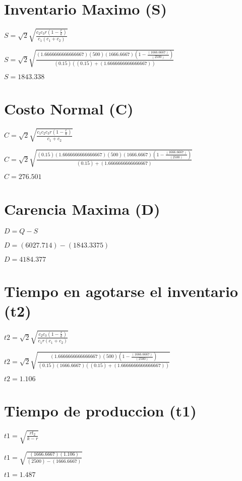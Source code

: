 \documentclass{article}
\newcommand*\rbreak{\par\noindent\linebreak}
\begin{document}
\section{\Huge \Huge Inventario Maximo (S)}
\begin{huge}
$S = \sqrt{2} \sqrt{\frac{c_{2} c_{3} r \left(1 - \frac{r}{k}\right)}{c_{1} \left(c_{1} + c_{2}\right)}}$\rbreak
$S = \sqrt{2} \sqrt{\frac{(1.6666666666666667) (500)  (1666.6667)  \left(1 - \frac{ (1666.6667) }{ (2500) }\right)}{(0.15) \left((0.15) + (1.6666666666666667)\right)}}$\rbreak
$S = 1843.338$
\end{huge}
\section{\Huge \Huge Costo Normal (C)}
\begin{huge}
$C = \sqrt{2} \sqrt{\frac{c_{1} c_{2} c_{3} r \left(1 - \frac{r}{k}\right)}{c_{1} + c_{2}}}$\rbreak
$C = \sqrt{2} \sqrt{\frac{(0.15) (1.6666666666666667) (500)  (1666.6667)  \left(1 - \frac{ (1666.6667) }{ (2500) }\right)}{(0.15) + (1.6666666666666667)}}$\rbreak
$C = 276.501$
\end{huge}
\section{\Huge \Huge Carencia Maxima (D)}
\begin{huge}
$D = Q - S$\rbreak
$D =  (6027.714)  -  (1843.3375) $\rbreak
$D = 4184.377$
\end{huge}
\section{\Huge \Huge Tiempo en agotarse el inventario (t2)}
\begin{huge}
$t2 = \sqrt{2} \sqrt{\frac{c_{2} c_{3} \left(1 - \frac{r}{k}\right)}{c_{1} r \left(c_{1} + c_{2}\right)}}$\rbreak
$t2 = \sqrt{2} \sqrt{\frac{(1.6666666666666667) (500) \left(1 - \frac{ (1666.6667) }{ (2500) }\right)}{(0.15)  (1666.6667)  \left((0.15) + (1.6666666666666667)\right)}}$\rbreak
$t2 = 1.106$
\end{huge}
\section{\Huge \Huge Tiempo de produccion (t1)}
\begin{huge}
$t1 = \sqrt{\frac{r t_{2}}{k - r}}$\rbreak
$t1 = \sqrt{\frac{ (1666.6667)  (1.106)}{ (2500)  -  (1666.6667) }}$\rbreak
$t1 = 1.487$
\end{huge}
\end{document}
